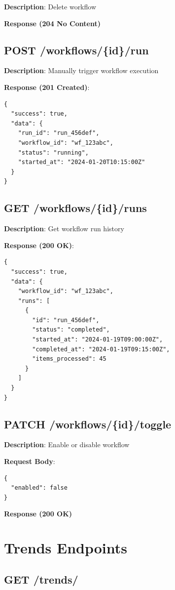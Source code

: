 \documentclass[12pt,a4paper]{report}
\begin{document}
\textbf{Description}: Delete workflow

\textbf{Response (204 No Content)}

\section{POST /workflows/\{id\}/run}

\textbf{Description}: Manually trigger workflow execution

\textbf{Response (201 Created)}:
\begin{lstlisting}
{
  "success": true,
  "data": {
    "run_id": "run_456def",
    "workflow_id": "wf_123abc",
    "status": "running",
    "started_at": "2024-01-20T10:15:00Z"
  }
}
\end{lstlisting}

\section{GET /workflows/\{id\}/runs}

\textbf{Description}: Get workflow run history

\textbf{Response (200 OK)}:
\begin{lstlisting}
{
  "success": true,
  "data": {
    "workflow_id": "wf_123abc",
    "runs": [
      {
        "id": "run_456def",
        "status": "completed",
        "started_at": "2024-01-19T09:00:00Z",
        "completed_at": "2024-01-19T09:15:00Z",
        "items_processed": 45
      }
    ]
  }
}
\end{lstlisting}

\section{PATCH /workflows/\{id\}/toggle}

\textbf{Description}: Enable or disable workflow

\textbf{Request Body}:
\begin{lstlisting}
{
  "enabled": false
}
\end{lstlisting}

\textbf{Response (200 OK)}

\chapter{Trends Endpoints}

\section{GET /trends/}
\end{document}
